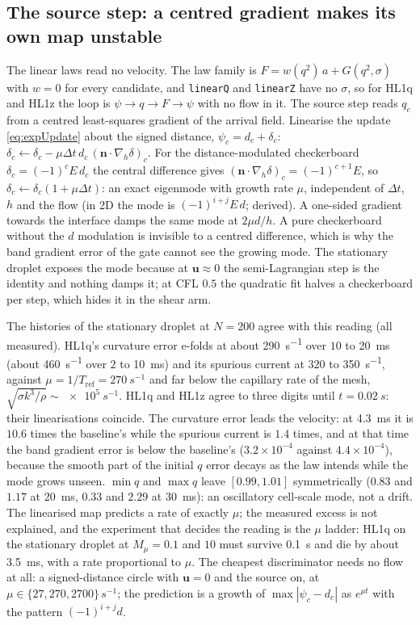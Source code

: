 \documentclass[preprint,3p,11pt]{elsarticle}
\newcommand{\psilev}{\psi}
\newcommand{\nhat}{\mathbf{n}}
\newcommand{\bu}{\mathbf{u}}
\begin{document}
\subsection{The source step: a centred gradient makes its own map unstable}
\label{sec:disc-source}
The linear laws read no velocity. The law family is $F=w(q^2)\,a+G(q^2,\sigma)$ with
$w=0$ for every candidate, and \texttt{linearQ} and \texttt{linearZ} have no
$\sigma$, so for HL1q and HL1z the loop is $\psilev\to q\to F\to\psilev$ with no flow in
it. The source step reads $q_c$ from a centred least-squares gradient of the arrival
field. Linearise the update \eqref{eq:expUpdate} about the signed distance,
$\psilev_c=d_c+\delta_c$: $\delta_c\leftarrow\delta_c-\mu\Delta t\,d_c\,(\nhat\cdot
\nabla_h\delta)_c$. For the distance-modulated checkerboard $\delta_c=(-1)^cE\,d_c$ the
central difference gives $(\nhat\cdot\nabla_h\delta)_c=(-1)^{c+1}E$, so
$\delta_c\leftarrow\delta_c(1+\mu\Delta t)$: an exact eigenmode with growth rate
$\mu$, independent of $\Delta t$, $h$ and the flow (in 2D the mode is $(-1)^{i+j}E\,d$;
derived). A one-sided gradient towards the interface damps the same mode at $2\mu d/h$.
A pure checkerboard without the $d$ modulation is invisible to a centred difference,
which is why the band gradient error of the gate cannot see the growing mode. The
stationary droplet exposes the mode because at $\bu\approx0$ the semi-Lagrangian step
is the identity and nothing damps it; at CFL $0.5$ the quadratic fit halves a
checkerboard per step, which hides it in the shear arm.

The histories of the stationary droplet at $N=200$ agree with this reading (all
measured). HL1q's curvature error e-folds at about \SI{290}{s^{-1}} over $10$ to
\SI{20}{ms} (about \SI{460}{s^{-1}} over $2$ to \SI{10}{ms}) and its spurious current at
$320$ to \SI{350}{s^{-1}}, against $\mu=1/T_\mathrm{ref}=\SI{270}{s^{-1}}$ and far below
the capillary rate of the mesh, $\sqrt{\sigma k^3/\rho}\sim\SI{e5}{s^{-1}}$. HL1q and
HL1z agree to three digits until $t=\SI{0.02}{s}$: their linearisations coincide. The
curvature error leads the velocity: at \SI{4.3}{ms} it is $10.6$ times the baseline's
while the spurious current is $1.4$ times, and at that time the band gradient error is
below the baseline's ($3.2\times10^{-4}$ against $4.4\times10^{-4}$), because the smooth
part of the initial $q$ error decays as the law intends while the mode grows unseen.
$\min q$ and $\max q$ leave $[0.99,1.01]$ symmetrically ($0.83$ and $1.17$ at
\SI{20}{ms}, $0.33$ and $2.29$ at \SI{30}{ms}): an oscillatory cell-scale mode, not a
drift. The linearised map predicts a rate of exactly $\mu$; the measured excess is not
explained, and the experiment that decides the reading is the $\mu$ ladder: HL1q on the
stationary droplet at $M_\mu=0.1$ and $10$ must survive \SI{0.1}{s} and die by about
\SI{3.5}{ms}, with a rate proportional to $\mu$. The cheapest discriminator needs no
flow at all: a signed-distance circle with $\bu=0$ and the source on, at
$\mu\in\{27,270,2700\}\,\si{s^{-1}}$; the prediction is a growth of
$\max|\psilev_c-d_c|$ as $e^{\mu t}$ with the pattern $(-1)^{i+j}d$.
\end{document}
